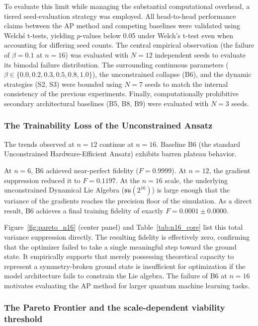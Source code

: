 \documentclass[10pt,twocolumn]{article}
\theoremstyle{remark}
\begin{document}
To evaluate this limit while managing the substantial computational overhead, a tiered seed-evaluation strategy was employed. All head-to-head performance claims between the AP method and competing baselines were validated using Welch\'s t-tests, yielding $p$-values below 0.05 under Welch's t-test even when accounting for differing seed counts. The central empirical observation (the failure of $\beta=0.1$ at $n=16$) was evaluated with $N=12$ independent seeds to evaluate its bimodal failure distribution. The surrounding continuous parameters ($\beta \in \{0.0, 0.2, 0.3, 0.5, 0.8, 1.0\}$), the unconstrained collapse (B6), and the dynamic strategies (S2, S3) were bounded using $N=7$ seeds to match the internal consistency of the previous experiments. Finally, computationally prohibitive secondary architectural baselines (B5, B8, B9) were evaluated with $N=3$ seeds.

\subsubsection{The Trainability Loss of the Unconstrained Ansatz}

The trends observed at $n=12$ continue at $n=16$. Baseline B6 (the standard Unconstrained Hardware-Efficient Ansatz) exhibits barren plateau behavior.

At $n=6$, B6 achieved near-perfect fidelity ($F=0.9999$). At $n=12$, the gradient suppression reduced it to $F=0.1197$. At the $n=16$ scale, the underlying unconstrained Dynamical Lie Algebra ($\mathfrak{su}(2^{16})$) is large enough that the variance of the gradients reaches the precision floor of the simulation. As a direct result, B6 achieves a final training fidelity of exactly $F=0.0001 \pm 0.0000$.

Figure~\ref{fig:pareto_n16} (center panel) and Table~\ref{tab:n16_core} list this total variance suppression directly. The resulting fidelity is effectively zero, confirming that the optimizer failed to take a single meaningful step toward the ground state. It empirically supports that merely possessing theoretical capacity to represent a symmetry-broken ground state is insufficient for optimization if the model architecture fails to constrain the Lie algebra. The failure of B6 at $n=16$ motivates evaluating the AP method for larger quantum machine learning tasks.

\subsubsection{The Pareto Frontier and the scale-dependent viability threshold}
\end{document}
